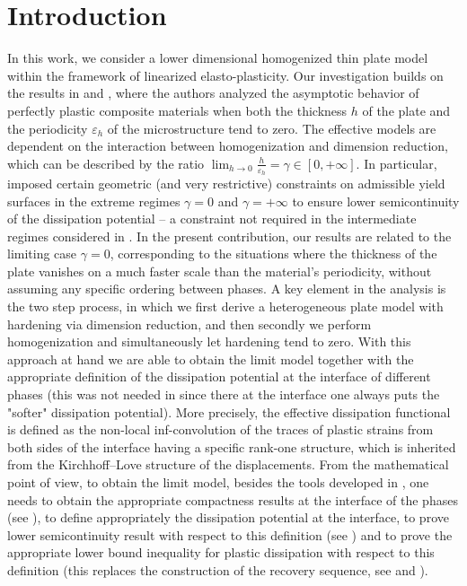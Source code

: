 \documentclass[reqno,10pt]{amsart}
\numberwithin{equation}{section}
\theoremstyle{remark}
\newcommand{\BLACK}{\color{black}}
\newcommand{\PINK}{\color{black}}
\begin{document}
\vspace{-\baselineskip}

\section{Introduction}
In this work, we consider a lower dimensional homogenized thin plate model within the framework of linearized elasto-plasticity.
Our investigation builds on the results in \cite{Buzancic.Davoli.Velcic.2024.1st} and \cite{Buzancic.Davoli.Velcic.2024.2nd}, where the authors analyzed the asymptotic behavior of perfectly plastic composite materials when both the thickness $h$ of the plate and the periodicity $\varepsilon_h$ of the microstructure tend to zero.
The effective models are dependent on the interaction between homogenization and dimension reduction, which can be described by the ratio $\lim_{h \to 0} \frac{h}{\varepsilon_h} = \gamma \in [0, +\infty]$.
In particular, \cite{Buzancic.Davoli.Velcic.2024.2nd} imposed certain geometric (and very restrictive) constraints on admissible yield surfaces in the extreme regimes $\gamma = 0$ and $\gamma = +\infty$ to ensure lower semicontinuity of the dissipation potential -- a constraint not required in the intermediate regimes considered in \cite{Buzancic.Davoli.Velcic.2024.1st}.
In the present contribution, {\PINK our results are related to the limiting case $\gamma = 0$\BLACK}, corresponding to the situations where the thickness of the plate vanishes on a much faster scale than the material's periodicity, without assuming any specific ordering between phases.
A key element in the analysis is the two step process, in which we first derive a heterogeneous plate model with hardening via dimension reduction, and then secondly we perform homogenization and simultaneously let hardening tend to zero.
With this approach at hand we are able to obtain the limit model together with the appropriate definition of the dissipation potential at the interface of different phases (this was not needed in \cite{Buzancic.Davoli.Velcic.2024.2nd} since there at the interface one always puts the "softer" dissipation potential).
More precisely, the effective dissipation functional is defined as the non-local inf-convolution of the traces of plastic strains from both sides of the interface having a specific rank-one structure, which is inherited from the Kirchhoff--Love structure of the displacements.
From the mathematical point of view, to obtain the limit model, besides the tools developed in \cite{Buzancic.Davoli.Velcic.2024.2nd}, one needs to obtain the appropriate compactness results at the interface of the phases (see ), to define appropriately the dissipation potential at the interface, to prove lower semicontinuity result with respect to this definition (see ) and to prove the appropriate lower bound inequality for plastic dissipation with respect to this definition (this replaces the construction of the recovery sequence, see  and ).
\end{document}
